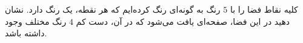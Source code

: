 \EXERCISE
کلیه نقاط فضا را با
$5$
رنگ به گونه‌ای رنگ کرده‌ایم که هر نقطه، یک رنگ دارد. نشان دهید در این فضا، صفحه‌ای یافت می‌شود که در آن، دست کم
$4$
رنگ مختلف وجود داشته باشد.